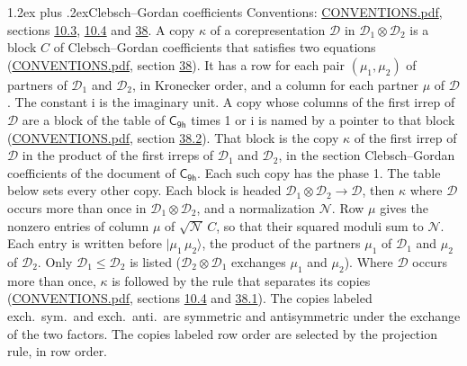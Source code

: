 \documentclass[10pt,a4paper]{article}
\makeatletter
\renewcommand\section{\@startsection{section}{1}{\z@}{-3ex plus -1ex minus -.2ex}%
  {1.2ex plus .2ex}{\normalfont\large\sffamily\bfseries\color{parttitle}}}
\numberwithin{equation}{section}
\newcommand{\grp}[1]{\mathsf{#1}}
\newcommand{\iunit}{\mathrm{i}}
\newcommand{\irrprod}{\otimes}
\newcommand{\mult}{\kappa}
\newcommand{\intx}{\mu}
\newcommand{\cgnorm}{\mathcal{N}}
\newcommand{\prodket}[2]{\lvert {#1}\,{#2}\rangle}
\makeatother
\begin{document}
\section{Clebsch--Gordan coefficients}\label{s:clebsch_gordan}
Conventions: \href{../../CONVENTIONS.pdf}{CONVENTIONS.pdf}, sections \href{../../../rotation/CONVENTIONS.pdf\#conv.10.3}{10.3}, \href{../../../rotation/CONVENTIONS.pdf\#conv.10.4}{10.4} and \href{../../CONVENTIONS.pdf\#conv.38}{38}.
\leavevmode\label{n:index.copy}\label{n:matrix.cg.stored}A copy $\mult$ of a corepresentation $\mathcal{D}$ in $\mathcal{D}_1\irrprod\mathcal{D}_2$ is a block $C$ of Clebsch--Gordan coefficients that satisfies two equations (\href{../../CONVENTIONS.pdf}{CONVENTIONS.pdf}, section \href{../../CONVENTIONS.pdf\#conv.38}{38}). \label{n:index.cg}It has a row for each pair $(\intx_1, \intx_2)$ of partners of $\mathcal{D}_1$ and $\mathcal{D}_2$, in Kronecker order, and a column for each partner $\intx$ of $\mathcal{D}$.
The constant $\iunit$ is the imaginary unit.
A copy whose columns of the first irrep of $\mathcal{D}$ are a block of the table of $\grp{C_{9h}}$ times 1 or $\iunit$ is named by a pointer to that block (\href{../../CONVENTIONS.pdf}{CONVENTIONS.pdf}, section \href{../../CONVENTIONS.pdf\#conv.38.2}{38.2}). That block is the copy $\mult$ of the first irrep of $\mathcal{D}$ in the product of the first irreps of $\mathcal{D}_1$ and $\mathcal{D}_2$, in the section Clebsch--Gordan coefficients of the document of \href{../../../rotation/data/pdf/C9h.pdf}{$\grp{C_{9h}}$}. Each such copy has the phase 1. The table below sets every other copy.
Each block is headed $\mathcal{D}_1\irrprod\mathcal{D}_2\to\mathcal{D}$, then $\mult$ where $\mathcal{D}$ occurs more than once in $\mathcal{D}_1\irrprod\mathcal{D}_2$, and a normalization $\cgnorm$. Row $\intx$ gives the nonzero entries of column $\intx$ of $\sqrt{\cgnorm}\,C$, so that their squared moduli sum to $\cgnorm$. \label{n:vector.ket.product}Each entry is written before $\prodket{\intx_1}{\intx_2}$, the product of the partners $\intx_1$ of $\mathcal{D}_1$ and $\intx_2$ of $\mathcal{D}_2$. Only $\mathcal{D}_1 \le \mathcal{D}_2$ is listed ($\mathcal{D}_2\irrprod\mathcal{D}_1$ exchanges $\intx_1$ and $\intx_2$).
Where $\mathcal{D}$ occurs more than once, $\mult$ is followed by the rule that separates its copies (\href{../../CONVENTIONS.pdf}{CONVENTIONS.pdf}, sections \href{../../../rotation/CONVENTIONS.pdf\#conv.10.4}{10.4} and \href{../../CONVENTIONS.pdf\#conv.38.1}{38.1}). \label{n:abbreviation.exchange}The copies labeled exch.\ sym.\ and exch.\ anti.\ are symmetric and antisymmetric under the exchange of the two factors. The copies labeled row order are selected by the projection rule, in row order.
\end{document}
